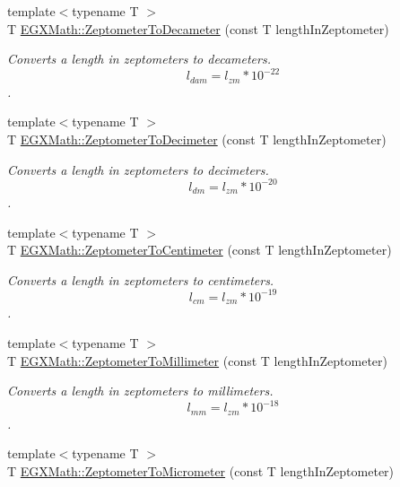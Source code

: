 \begin{DoxyCompactItemize}
{\footnotesize template$<$typename T $>$ }\\T \mbox{\hyperlink{group___e_g_x_math-_conversions-_length_conversions-_s_i-_zeptometer-_s_i_ga4076e322cf0f16f1eb977409e4f8f251}{E\+G\+X\+Math\+::\+Zeptometer\+To\+Decameter}} (const T length\+In\+Zeptometer)
\begin{DoxyCompactList}\small\item\em Converts a length in zeptometers to decameters. \[ l_{dam}=l_{zm} * 10^{-22} \]. \end{DoxyCompactList}\item 
{\footnotesize template$<$typename T $>$ }\\T \mbox{\hyperlink{group___e_g_x_math-_conversions-_length_conversions-_s_i-_zeptometer-_s_i_ga9a25b6696c3f6ed8df86a77e1da46830}{E\+G\+X\+Math\+::\+Zeptometer\+To\+Decimeter}} (const T length\+In\+Zeptometer)
\begin{DoxyCompactList}\small\item\em Converts a length in zeptometers to decimeters. \[ l_{dm}=l_{zm} * 10^{-20} \]. \end{DoxyCompactList}\item 
{\footnotesize template$<$typename T $>$ }\\T \mbox{\hyperlink{group___e_g_x_math-_conversions-_length_conversions-_s_i-_zeptometer-_s_i_ga11d9546ba555e2fca128d6c905fed139}{E\+G\+X\+Math\+::\+Zeptometer\+To\+Centimeter}} (const T length\+In\+Zeptometer)
\begin{DoxyCompactList}\small\item\em Converts a length in zeptometers to centimeters. \[ l_{cm}=l_{zm} * 10^{-19} \]. \end{DoxyCompactList}\item 
{\footnotesize template$<$typename T $>$ }\\T \mbox{\hyperlink{group___e_g_x_math-_conversions-_length_conversions-_s_i-_zeptometer-_s_i_ga5caeffbc654c4bfc6390ed822cee42a5}{E\+G\+X\+Math\+::\+Zeptometer\+To\+Millimeter}} (const T length\+In\+Zeptometer)
\begin{DoxyCompactList}\small\item\em Converts a length in zeptometers to millimeters. \[ l_{mm}=l_{zm} * 10^{-18} \]. \end{DoxyCompactList}\item 
{\footnotesize template$<$typename T $>$ }\\T \mbox{\hyperlink{group___e_g_x_math-_conversions-_length_conversions-_s_i-_zeptometer-_s_i_ga3ff7c51338abdb80d18becf7245a32fd}{E\+G\+X\+Math\+::\+Zeptometer\+To\+Micrometer}} (const T length\+In\+Zeptometer)

\end{DoxyCompactItemize}
